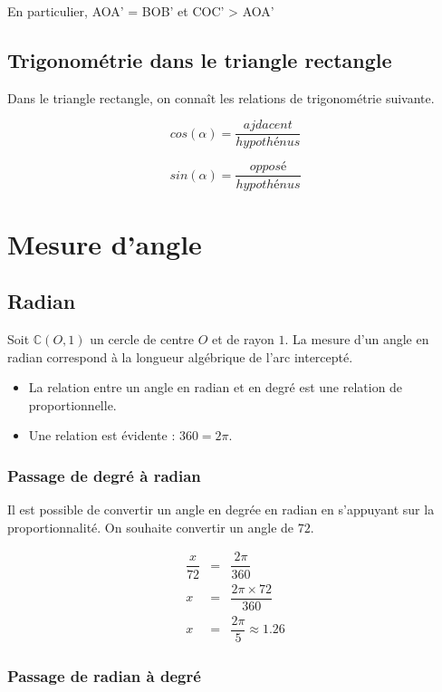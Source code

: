 \documentclass[paper=a4, fontsize=11pt]{scrartcl} %
\begin{document}
En particulier, AOA' = BOB' et COC' > AOA'

\subsection{Trigonométrie dans le triangle rectangle}

Dans le triangle rectangle, on connaît les relations de trigonométrie suivante.

$$cos(\alpha) = \dfrac{ajdacent}{hypothénus}$$

$$sin(\alpha) = \dfrac{opposé}{hypothénus}$$

\section{Mesure d'angle}

\subsection{Radian}

\begin{Definition}
  Soit $\mathbb{C}(O,1)$ un cercle de centre $O$ et de rayon $1$. La mesure d'un angle en radian correspond à la longueur algébrique de l'arc intercepté.
\end{Definition}

\begin{itemize}
\item La relation entre un angle en radian et en degré est une relation de proportionnelle.
\item Une relation est évidente : $360 = 2\pi$.
\end{itemize}

\subsubsection{Passage de degré à radian}

Il est possible de convertir un angle en degrée en radian en s'appuyant sur la proportionnalité. On souhaite convertir un angle de $72$.

\begin{eqnarray*}
  \dfrac{x}{72 } &=& \dfrac{2\pi}{360}\\
  x &=& \dfrac{2 \pi \times 72 }{360 }\\
  x &=& \dfrac{2 \pi}{5} \approx 1.26
\end{eqnarray*}


\subsubsection{Passage de radian à degré}
\end{document}
